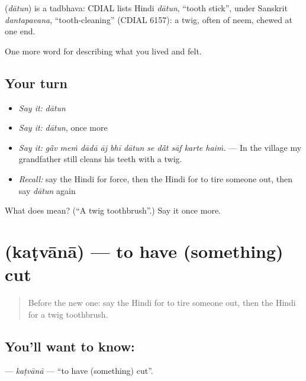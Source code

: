 \begin{cousinweb}
\textbf{} (\emph{dātun}) is a tadbhava: CDIAL lists Hindi \emph{dātun}, \textquotedblleft{}tooth stick\textquotedblright{}, under Sanskrit \emph{dantapavana}, \textquotedblleft{}tooth-cleaning\textquotedblright{} (CDIAL 6157): a twig, often of neem, chewed at one end.
\end{cousinweb}

\begin{grammarlens}[title={What you've built}]
One more word for describing what you lived and felt.
\end{grammarlens}

\subsection*{Your turn}
\begin{itemize}
\raggedright
  \item \emph{Say it:} \emph{dātun}
  \item \emph{Say it:} \emph{dātun}, once more
  \item \emph{Say it:} \emph{gā̃v meṁ dādā āj bhī dātun se dā̃t sāf karte haiṁ.} — In the village my grandfather still cleans his teeth with a twig.
  \item \emph{Recall:} say the Hindi for force, then the Hindi for to tire someone out, then say \emph{dātun} again
\end{itemize}

\begin{tcolorbox}[breakable,colback=teal!4,colframe=teal!35!black,title={Before you move on}]
What does  mean? (\textquotedblleft{}A twig toothbrush\textquotedblright{}.) Say it once more.
\end{tcolorbox}
\section[\texorpdfstring{\hi{कटवाना} (kaṭvānā)}{कटवाना (kaṭvānā)}]{ (kaṭvānā) — to have (something) cut}

\label{lesson:HI-C484-katvana}



\begin{quote}
Before the new one: say the Hindi for to tire someone out, then the Hindi for a twig toothbrush.
\end{quote}

\subsection*{You'll want to know: }
\textbf{} — \emph{kaṭvānā} — \textquotedblleft{}to have (something) cut\textquotedblright{}.

